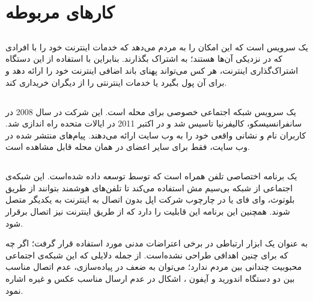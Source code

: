 \section{کار‌های مربوطه}
\subsection{}
\href{https://www.opengarden.com}{}%
یک سرویس است که این امکان را به مردم می‌دهد که  خدمات اینترنت خود را با افرادی که در نزدیکی آن‌ها هستند؛ به اشتراک بگذارند. بنابراین با استفاده از این دستگاه اشتراک‌گذاری اینترنت، هر کس می‌تواند پهنای باند اضافی اینترنت خود را ارائه دهد و برای آن پول بگیرد یا خدمات اینترنتی را از دیگران خریداری کند.
\cite{OpenGardenWiki}

\subsection{} 
\href{https://nextdoor.com}{}%
یک سرویس شبکه اجتماعی خصوصی برای محله است. این شرکت در سال 2008 در سانفرانسیسکو، کالیفرنیا تاسیس شد و در اکتبر 2011 در ایالات متحده راه اندازی شد. کاربران 
نام و نشانی واقعی خود را به وب سایت ارائه می‌دهند. پیام‌های منتشر شده در وب سایت، فقط برای سایر اعضای  
در همان محله قابل مشاهده است.
\cite{NextDoorWiki}

\subsection{}
\href{https://www.opengarden.com/firechat/}{}%
یک برنامه اختصاصی تلفن همراه است که توسط
توسعه داده شده‌است. این شبکه‌ی اجتماعی از شبکه بی‌سیم مش استفاده می‌کند تا تلفن‌های هوشمند بتوانند از طریق بلوتوث، وای فای یا در چارچوب
شرکت اپل بدون اتصال به اینترنت به یکدیگر متصل شوند. همچنین این برنامه این قابلیت را دارد که از طریق اینترنت نیز اتصال برقرار شود.

به عنوان یک ابزار ارتباطی در برخی اعتراضات مدنی مورد استفاده قرار گرفت؛ اگر چه که برای چنین اهدافی طراحی نشده‌است. از جمله دلایلی که این شبکه‌ی اجتماعی محبوبیت چندانی بین مردم ندارد؛ می‌توان به ضعف در پیاده‌سازی، عدم اتصال مناسب بین دو دستگاه اندورید
و آیفون
، اشکال در عدم ارسال مناسب عکس و غیره اشاره نمود.    
\cite{FireChatWiki}
